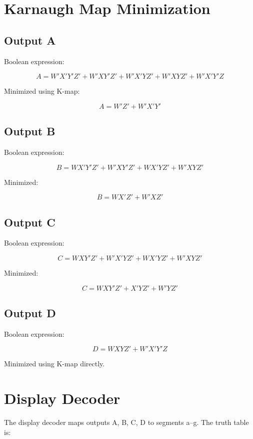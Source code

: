 \documentclass[12pt]{article}
\begin{document}
\section{Karnaugh Map Minimization}

\subsection*{Output A}
Boolean expression:


\[
A = W'X'Y'Z' + W'XY'Z' + W'X'YZ' + W'XYZ' + W'X'Y'Z
\]


Minimized using K-map:


\[
A = W'Z' + W'X'Y'
\]



\subsection*{Output B}
Boolean expression:


\[
B = WX'Y'Z' + W'XY'Z' + WX'YZ' + W'XYZ'
\]


Minimized:


\[
B = WX'Z' + W'XZ'
\]



\subsection*{Output C}
Boolean expression:


\[
C = WXY'Z' + W'X'YZ' + WX'YZ' + W'XYZ'
\]


Minimized:


\[
C = WXY'Z' + X'YZ' + W'YZ'
\]



\subsection*{Output D}
Boolean expression:


\[
D = WXYZ' + W'X'Y'Z
\]


Minimized using K-map directly.

\section{Display Decoder}
The display decoder maps outputs A, B, C, D to segments a–g. The truth table is:
\end{document}
